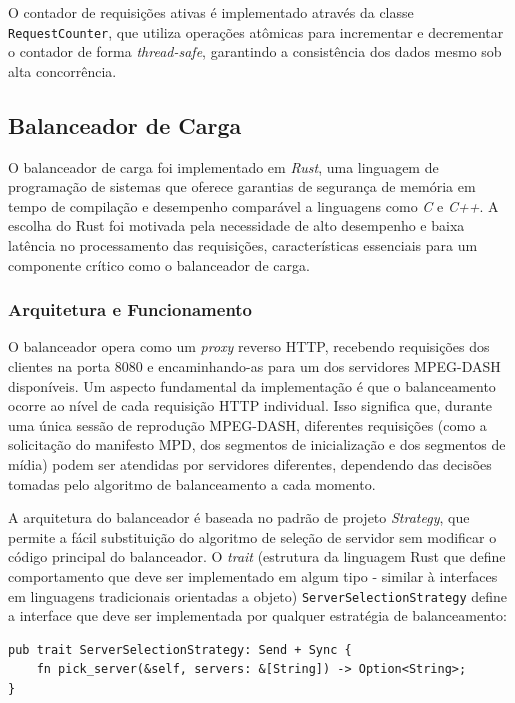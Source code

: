 O contador de requisições ativas é implementado através da classe \texttt{RequestCounter}, que utiliza operações atômicas para incrementar e decrementar o contador de forma \textit{thread-safe}, garantindo a consistência dos dados mesmo sob alta concorrência.


\subsection{Balanceador de Carga}

O balanceador de carga foi implementado em \textit{Rust}, uma linguagem de programação de sistemas que oferece garantias de segurança de memória em tempo de compilação e desempenho comparável a linguagens como \textit{C} e \textit{C++}. A escolha do Rust foi motivada pela necessidade de alto desempenho e baixa latência no processamento das requisições, características essenciais para um componente crítico como o balanceador de carga.

\subsubsection{Arquitetura e Funcionamento}

O balanceador opera como um \textit{proxy} reverso HTTP, recebendo requisições dos clientes na porta 8080 e encaminhando-as para um dos servidores MPEG-DASH disponíveis. Um aspecto fundamental da implementação é que o balanceamento ocorre ao nível de cada requisição HTTP individual. Isso significa que, durante uma única sessão de reprodução MPEG-DASH, diferentes requisições (como a solicitação do manifesto MPD, dos segmentos de inicialização e dos segmentos de mídia) podem ser atendidas por servidores diferentes, dependendo das decisões tomadas pelo algoritmo de balanceamento a cada momento.

A arquitetura do balanceador é baseada no padrão de projeto \textit{Strategy}, que permite a fácil substituição do algoritmo de seleção de servidor sem modificar o código principal do balanceador. O \textit{trait} (estrutura da linguagem Rust que define comportamento que deve ser implementado em algum tipo - similar à interfaces em linguagens tradicionais orientadas a objeto) \texttt{ServerSelectionStrategy} define a interface que deve ser implementada por qualquer estratégia de balanceamento:

\begin{verbatim}
pub trait ServerSelectionStrategy: Send + Sync {
    fn pick_server(&self, servers: &[String]) -> Option<String>;
}
\end{verbatim}

